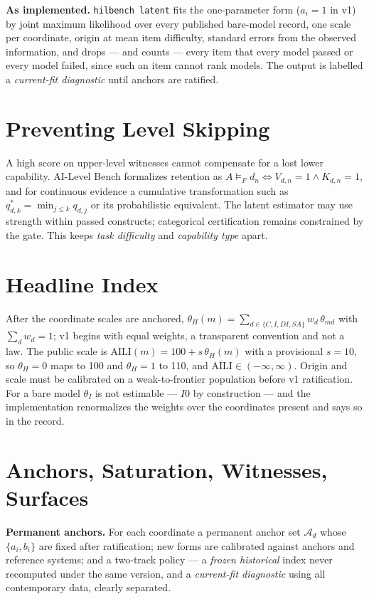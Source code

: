 \textbf{As implemented.} \texttt{hilbench latent} fits the one-parameter form ($a_i = 1$ in v1) by joint maximum likelihood over every published bare-model record, one scale per coordinate, origin at mean item difficulty, standard errors from the observed information, and drops --- and counts --- every item that every model passed or every model failed, since such an item cannot rank models. The output is labelled a \emph{current-fit diagnostic} until anchors are ratified.

\section{Preventing Level Skipping}\label{sec:skip}

A high score on upper-level witnesses cannot compensate for a lost lower capability. AI-Level Bench formalizes retention as $A \models_F d_n \iff V_{d,n} = 1 \wedge K_{d,n} = 1$, and for continuous evidence a cumulative transformation such as $q^{*}_{d,k} = \min_{j \le k} q_{d,j}$ or its probabilistic equivalent. The latent estimator may use strength within passed constructs; categorical certification remains constrained by the gate. This keeps \emph{task difficulty} and \emph{capability type} apart.

\section{Headline Index}\label{sec:headline}

After the coordinate scales are anchored, $\theta_H(m) = \sum_{d \in \{C, I, DI, SA\}} w_d\,\theta_{md}$ with $\sum_d w_d = 1$; v1 begins with equal weights, a transparent convention and not a law. The public scale is $\mathrm{AILI}(m) = 100 + s\,\theta_H(m)$ with a provisional $s = 10$, so $\theta_H = 0$ maps to 100 and $\theta_H = 1$ to 110, and $\mathrm{AILI} \in (-\infty, \infty)$. Origin and scale must be calibrated on a weak-to-frontier population before v1 ratification. For a bare model $\theta_I$ is not estimable --- $I0$ by construction --- and the implementation renormalizes the weights over the coordinates present and says so in the record.

\section{Anchors, Saturation, Witnesses, Surfaces}\label{sec:anchors}

\textbf{Permanent anchors.} For each coordinate a permanent anchor set $\mathcal A_d$ whose $\{a_i, b_i\}$ are fixed after ratification; new forms are calibrated against anchors and reference systems; and a two-track policy --- a \emph{frozen historical} index never recomputed under the same version, and a \emph{current-fit diagnostic} using all contemporary data, clearly separated.

